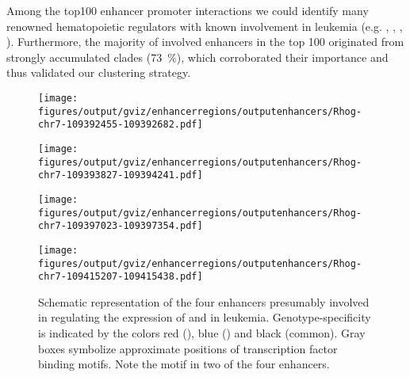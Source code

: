 Among the top\num{100} enhancer promoter interactions we could identify many renowned hematopoietic regulators with known involvement in leukemia (e.g. , , , ). Furthermore, the majority of involved enhancers in the top 100 originated from strongly accumulated clades (\SI{73}{\percent}), which corroborated their importance and thus validated our clustering strategy.

\begin{figure}[!bh]
	\vspace{2em}
	\begin{minipage}{0.5\textwidth}
		\texttt{[image: figures/output/gviz/enhancerregions/outputenhancers/Rhog-chr7-109392455-109392682.pdf]} 
	\end{minipage}
	\begin{minipage}{0.5\textwidth}
		\texttt{[image: figures/output/gviz/enhancerregions/outputenhancers/Rhog-chr7-109393827-109394241.pdf]} 
	\end{minipage}
	\begin{minipage}{0.5\textwidth}
		\texttt{[image: figures/output/gviz/enhancerregions/outputenhancers/Rhog-chr7-109397023-109397354.pdf]} 
	\end{minipage}
	\begin{minipage}{0.5\textwidth}
		\texttt{[image: figures/output/gviz/enhancerregions/outputenhancers/Rhog-chr7-109415207-109415438.pdf]} 
	\end{minipage}
	\caption{Schematic representation of the four enhancers presumably involved in regulating the expression of  and   in \mllafnine leukemia. Genotype-specificity is indicated by the colors red (\dnmtchipregular), blue (\dnmtwtregular) and black (common). Gray boxes symbolize approximate positions of transcription factor binding motifs. Note the \motifmlltwo motif in two of the four enhancers.	\vspace{2em}}
	\label{fig:enhancers:rhognup98:enh}
\end{figure}

